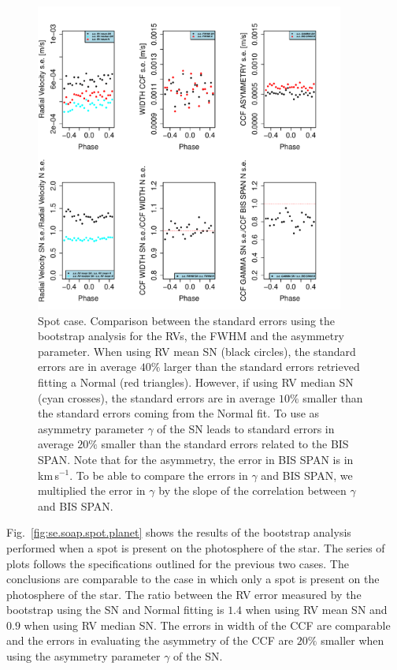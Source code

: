 \documentclass[11pt, oneside]{article}
\def\kms{\hbox{\,km\,s$^{-1}$}}       %
\begin{document}
{\begin{figure}[htbp]
   \centering
\includegraphics[height = 4in]{RV_comparison_SPOT_standard_errors.pdf} 
   \caption{Spot case. Comparison between the standard errors using the bootstrap analysis for the RVs, the FWHM and the asymmetry parameter. When using RV mean SN (black circles), the standard errors are in average $40\%$ larger than the standard errors retrieved fitting a Normal (red triangles). However, if using RV median SN (cyan crosses), the standard errors are in average $10\%$ smaller than the standard errors coming from the Normal fit. To use as asymmetry parameter $\gamma$ of the SN leads to standard errors in average $20\%$ smaller than the standard errors related to the BIS SPAN. Note that for the asymmetry, the error in BIS SPAN is in \kms. To be able to compare the errors in $\gamma$ and BIS SPAN, we multiplied the error in $\gamma$ by the slope of the correlation between $\gamma$ and BIS SPAN.}
   \label{fig:se.soap.spot}
\end{figure}

Fig.~\ref{fig:se.soap.spot.planet} shows the results of the bootstrap analysis performed when a spot is present on the photosphere of the star. The series of plots follows the specifications outlined for the previous two cases. The conclusions are comparable to the case in which only a spot is present on the photosphere of the star. The ratio between the RV error measured by the bootstrap using the SN and Normal fitting is $1.4$ when using RV mean SN and $0.9$ when using RV median SN. The errors in width of the CCF are comparable and the errors in evaluating the asymmetry of the CCF are $20\%$ smaller when using the asymmetry parameter $\gamma$ of the SN.

}
\end{document}
